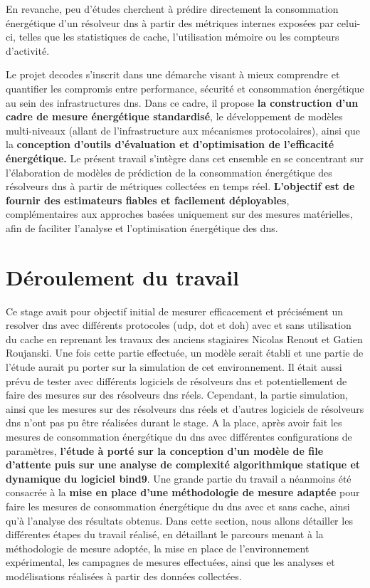 \documentclass[12pt, a4paper]{report}
\begin{document}
	En revanche, peu d'études cherchent à prédire directement la consommation énergétique d'un résolveur \gls{dns} à partir des métriques internes exposées par celui-ci, telles que les statistiques de cache, l'utilisation mémoire ou les compteurs d'activité.

	Le projet \gls{decodes} s'inscrit dans une démarche visant à mieux comprendre et quantifier les compromis entre performance, sécurité et consommation énergétique au sein des infrastructures \gls{dns}. Dans ce cadre, il propose \textbf{la construction d'un cadre de mesure énergétique standardisé}, le développement de modèles multi-niveaux (allant de l'infrastructure aux mécanismes protocolaires), ainsi que la \textbf{conception d'outils d'évaluation et d'optimisation de l'efficacité énergétique.} Le présent travail s'intègre dans cet ensemble en se concentrant sur l'élaboration de modèles de prédiction de la consommation énergétique des résolveurs \gls{dns} à partir de métriques collectées en temps réel. \textbf{L'objectif est de fournir des estimateurs fiables et facilement déployables}, complémentaires aux approches basées uniquement sur des mesures matérielles, afin de faciliter l'analyse et l'optimisation énergétique des \gls{dns}.


	\section{Déroulement du travail}

	Ce stage avait pour objectif initial de mesurer efficacement et précisément un resolver \gls{dns} avec différents protocoles (\gls{udp}, \gls{dot} et \gls{doh}) avec et sans utilisation du cache en reprenant les travaux des anciens stagiaires Nicolas Renout et Gatien Roujanski. Une fois cette partie effectuée, un modèle serait établi et une partie de l'étude aurait pu porter sur la simulation de cet environnement. Il était aussi prévu de tester avec différents logiciels de résolveurs \gls{dns} et potentiellement de faire des mesures sur des résolveurs \gls{dns} réels. Cependant, la partie simulation, ainsi que les mesures sur des résolveurs \gls{dns} réels et d'autres logiciels de résolveurs \gls{dns} n'ont pas pu être réalisées durant le stage. A la place, après avoir fait les mesures de consommation énergétique du \gls{dns} avec différentes configurations de paramètres, \textbf{l'étude à porté sur la conception d'un modèle de file d'attente puis sur une analyse de complexité algorithmique statique et dynamique du logiciel \gls{bind9}}. Une grande partie du travail a néanmoins été consacrée à la \textbf{mise en place d'une méthodologie de mesure adaptée} pour faire les mesures de consommation énergétique du \gls{dns} avec et sans cache, ainsi qu'à l'analyse des résultats obtenus.
	Dans cette section, nous allons détailler les différentes étapes du travail réalisé, en détaillant le parcours menant à la méthodologie de mesure adoptée, la mise en place de l'environnement expérimental, les campagnes de mesures effectuées, ainsi que les analyses et modélisations réalisées à partir des données collectées. 
	
\end{document}
